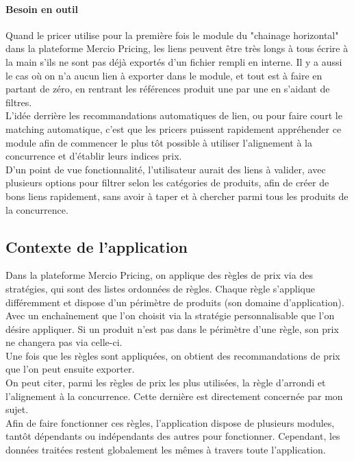 \documentclass{rapportCS}
\begin{document}
\paragraph{Besoin en outil}
Quand le pricer utilise pour la première fois le module du "chainage horizontal" dans la plateforme
Mercio Pricing, les liens peuvent être très longs à tous écrire à la 
main s'ils ne sont pas déjà exportés d'un fichier rempli en interne.
Il y a aussi le cas où on n'a aucun lien à exporter dans le module, et tout est à
faire en partant de zéro, en rentrant les références produit une par une en s'aidant de filtres.\\

L'idée derrière les recommandations automatiques de lien, ou pour faire court le matching automatique,
c'est que les pricers puissent rapidement appréhender ce module afin de commencer le plus tôt possible 
à utiliser l'alignement à la concurrence et d'établir leurs indices prix.\\
D'un point de vue fonctionnalité, l'utilisateur aurait des liens à valider, 
avec plusieurs options pour filtrer selon les catégories de produits, afin de créer de bons liens
rapidement, sans avoir à taper et à chercher parmi tous les produits de la concurrence.

\subsection{Contexte de l'application}
Dans la plateforme Mercio Pricing, on applique des règles de prix via des stratégies,
qui sont des listes ordonnées de règles.
Chaque règle s'applique différemment et dispose d'un périmètre de produits (son domaine d'application).
Avec un enchaînement que l'on choisit via la stratégie personnalisable que l'on désire appliquer.
Si un produit n'est pas dans le périmètre d'une règle, son prix ne changera pas via celle-ci.\\
Une fois que les règles sont appliquées, on obtient des recommandations de prix que l'on peut ensuite exporter.\\

On peut citer, parmi les règles de prix les plus utilisées, la règle d'arrondi et l'alignement 
à la concurrence. Cette dernière est directement concernée par mon sujet.\\

Afin de faire fonctionner ces règles, l'application dispose de plusieurs modules, tantôt dépendants 
ou indépendants des autres pour fonctionner.
Cependant, les données traitées restent globalement les mêmes à travers toute l'application.
\end{document}

